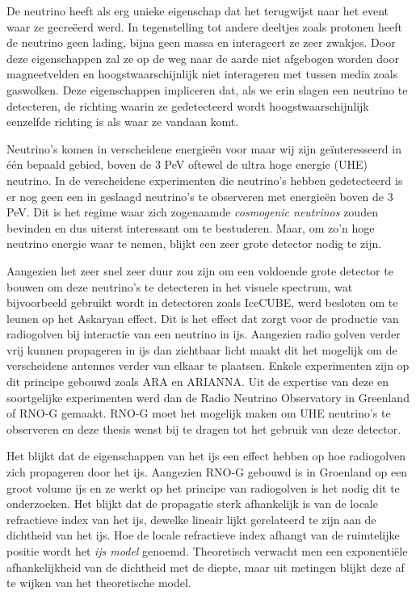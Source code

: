 De neutrino heeft als erg unieke eigenschap dat het terugwijst naar het event
waar ze gecreëerd werd. In tegenstelling tot andere deeltjes zoals protonen
heeft de neutrino geen lading, bijna geen massa en interageert ze zeer zwakjes.
Door deze eigenschappen zal ze op de weg naar de aarde niet afgebogen worden 
door magneetvelden en hoogstwaarschijnlijk niet interageren met tussen media zoals
gaswolken. Deze eigenschappen impliceren dat, als we erin slagen een neutrino te detecteren, de 
richting waarin ze gedetecteerd wordt hoogstwaarschijnlijk eenzelfde richting is als
waar ze vandaan komt.

Neutrino's komen in verscheidene energieën voor maar wij zijn geïnteresseerd in één bepaald gebied,
boven de 3 PeV oftewel de ultra hoge energie (UHE) neutrino. In de verscheidene experimenten die 
neutrino's hebben gedetecteerd is er nog geen een in geslaagd neutrino's te observeren met 
energieën boven de 3 PeV. Dit is het regime waar zich zogenaamde \textit{cosmogenic neutrinos} zouden
bevinden en dus uiterst interessant om te bestuderen. Maar, om zo'n hoge neutrino energie waar te nemen,
blijkt een zeer grote detector nodig te zijn.

Aangezien het zeer snel zeer duur zou zijn om een voldoende grote detector te bouwen om deze neutrino's 
te detecteren in het visuele spectrum, wat bijvoorbeeld gebruikt wordt in detectoren zoals IceCUBE,
werd besloten om te leunen op het Askaryan effect. Dit is het effect dat zorgt voor de productie
van radiogolven bij interactie van een neutrino in ijs. Aangezien radio golven verder vrij kunnen
propageren in ijs dan zichtbaar licht maakt dit het mogelijk om de verscheidene antennes verder
van elkaar te plaatsen. Enkele experimenten zijn op dit principe gebouwd zoals ARA en ARIANNA.
Uit de expertise van deze en soortgelijke experimenten werd dan de Radio Neutrino Observatory in Greenland of RNO-G gemaakt.
RNO-G moet het mogelijk maken om UHE neutrino's te observeren en deze thesis wenst bij te dragen tot het gebruik
van deze detector.

Het blijkt dat de eigenschappen van het ijs een effect hebben op hoe radiogolven zich propageren door het ijs.
Aangezien RNO-G gebouwd is in Groenland op een groot volume ijs en ze werkt op het principe van radiogolven
is het nodig dit te onderzoeken. Het blijkt dat de propagatie sterk afhankelijk is van de locale refractieve
index van het ijs, dewelke lineair lijkt gerelateerd te zijn aan de dichtheid van het ijs. Hoe de locale
refractieve index afhangt van de ruimtelijke positie wordt het \textit{ijs model} genoemd. Theoretisch
verwacht men een exponentiële afhankelijkheid van de dichtheid met de diepte, maar uit metingen blijkt deze
af te wijken van het theoretische model. 

